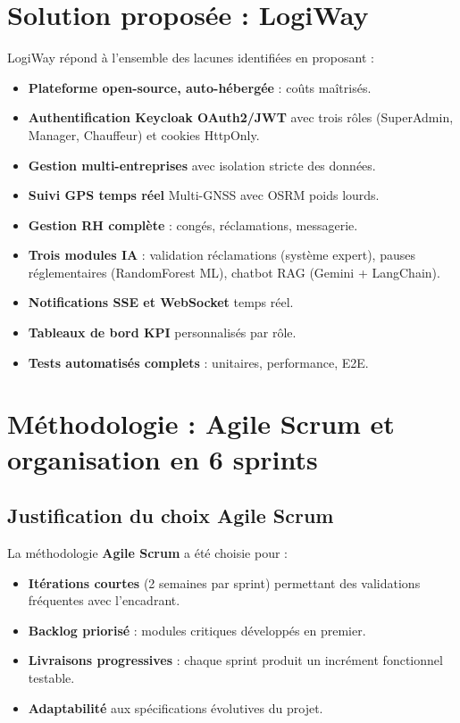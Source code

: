 \documentclass[12pt,a4paper]{report}
\begin{document}
\section{Solution proposée : LogiWay}
\label{sec:ch1-solution}

LogiWay répond à l'ensemble des lacunes identifiées en proposant :

\begin{itemize}
  \item \textbf{Plateforme open-source, auto-hébergée} : coûts maîtrisés.
  \item \textbf{Authentification Keycloak OAuth2/JWT} avec trois rôles
        (SuperAdmin, Manager, Chauffeur) et cookies HttpOnly.
  \item \textbf{Gestion multi-entreprises} avec isolation stricte des données.
  \item \textbf{Suivi GPS temps réel} Multi-GNSS avec OSRM poids lourds.
  \item \textbf{Gestion RH complète} : congés, réclamations, messagerie.
  \item \textbf{Trois modules IA} : validation réclamations (système expert),
        pauses réglementaires (RandomForest ML), chatbot RAG (Gemini + LangChain).
  \item \textbf{Notifications SSE et WebSocket} temps réel.
  \item \textbf{Tableaux de bord KPI} personnalisés par rôle.
  \item \textbf{Tests automatisés complets} : unitaires, performance, E2E.
\end{itemize}

\section{Méthodologie : Agile Scrum et organisation en 6 sprints}
\label{sec:ch1-methodologie}

\subsection{Justification du choix Agile Scrum}

La méthodologie \textbf{Agile Scrum} a été choisie pour :
\begin{itemize}
  \item \textbf{Itérations courtes} (2 semaines par sprint) permettant des
        validations fréquentes avec l'encadrant.
  \item \textbf{Backlog priorisé} : modules critiques développés en premier.
  \item \textbf{Livraisons progressives} : chaque sprint produit un incrément
        fonctionnel testable.
  \item \textbf{Adaptabilité} aux spécifications évolutives du projet.
\end{itemize}
\end{document}
